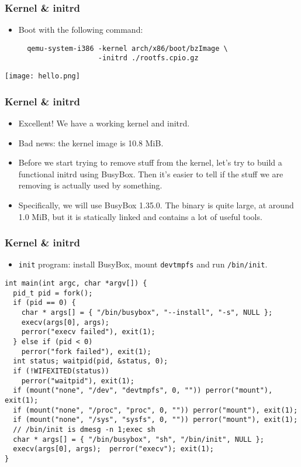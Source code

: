\documentclass{beamer}
\begin{document}
\begin{frame}[t,fragile]
\frametitle{Kernel \& initrd}
\begin{itemize}
  \item Boot with the following command:
\begin{Verbatim}
  qemu-system-i386 -kernel arch/x86/boot/bzImage \
                   -initrd ./rootfs.cpio.gz
\end{Verbatim}
\end{itemize}
\begin{center}
  \texttt{[image: hello.png]}
\end{center}
\end{frame}

\begin{frame}[t,fragile]
\frametitle{Kernel \& initrd}
\begin{itemize}
  \item Excellent! We have a working kernel and initrd.
  \item Bad news: the kernel image is 10.8 MiB.
  \item Before we start trying to remove stuff from the kernel, let's try to build a functional initrd using BusyBox. Then it's easier to tell if the stuff we are removing is actually used by something.
  \item Specifically, we will use BusyBox 1.35.0. The binary is quite large, at around 1.0 MiB, but it is statically linked and contains a lot of useful tools.
\end{itemize}
\end{frame}

\begin{frame}[t,fragile]
\frametitle{Kernel \& initrd}
\begin{itemize}
  \item \verb|init| program: install BusyBox, mount \verb|devtmpfs| and run \verb|/bin/init|.
\end{itemize}
\vspace{0.25cm}
\begin{verbatim}
int main(int argc, char *argv[]) {
  pid_t pid = fork();
  if (pid == 0) {
    char * args[] = { "/bin/busybox", "--install", "-s", NULL };
    execv(args[0], args);
    perror("execv failed"), exit(1);
  } else if (pid < 0)
    perror("fork failed"), exit(1);
  int status; waitpid(pid, &status, 0);
  if (!WIFEXITED(status))
    perror("waitpid"), exit(1);
  if (mount("none", "/dev", "devtmpfs", 0, "")) perror("mount"), exit(1);
  if (mount("none", "/proc", "proc", 0, "")) perror("mount"), exit(1);
  if (mount("none", "/sys", "sysfs", 0, "")) perror("mount"), exit(1);
  // /bin/init is dmesg -n 1;exec sh
  char * args[] = { "/bin/busybox", "sh", "/bin/init", NULL };
  execv(args[0], args);  perror("execv"); exit(1);
}
\end{verbatim}
\end{frame}
\end{document}
